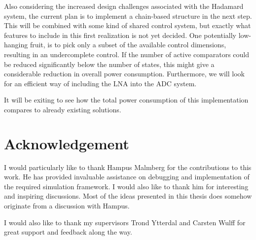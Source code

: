 Also considering the increased design challenges associated with the Hadamard system, the current plan is to implement a chain-based structure in the next step. This will be combined with some kind of shared control system, but exactly what features to include in this first realization is not yet decided. One potentially low-hanging fruit, is to pick only a subset of the available control dimensions, resulting in an undercomplete control. If the number of active comparators could be reduced significantly below the number of states, this might give a considerable reduction in overall power consumption. Furthermore, we will look for an efficient way of including the LNA into the ADC system.

It will be exiting to see how the total power consumption of this implementation compares to already existing solutions.

\newpage
\section*{Acknowledgement}
I would particularly like to thank Hampus Malmberg for the contributions to this work. He has provided invaluable assistance on debugging and implementation of the required simulation framework. I would also like to thank him for interesting and inspiring discussions. Most of the ideas presented in this thesis does somehow originate from a discussion with Hampus.

I would also like to thank my supervisors Trond Ytterdal and Carsten Wulff for great support and feedback along the way.
